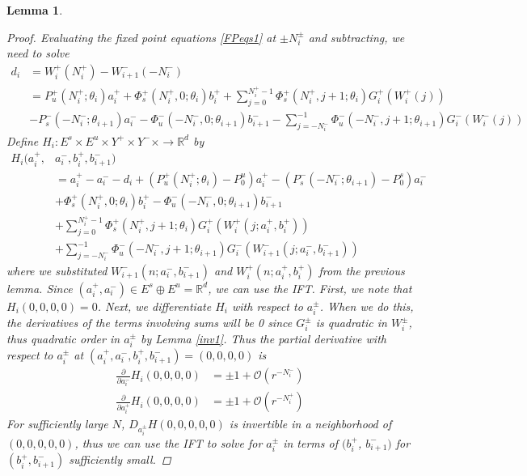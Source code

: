 \documentclass[12pt]{article}
\def\R{{\mathbb R}}
\newtheorem{lemma}{Lemma}
\begin{document}
\begin{lemma}
\begin{proof}
Evaluating the fixed point equations \eqref{FPeqs1} at $\pm N_i^\pm$ and subtracting, we need to solve
\begin{align*}
d_i &= W_i^+(N_i^+) - W_{i+1}^-(-N_i^-) \\
&= P_u^+(N_i^+; \theta_i) a_i^+ + \Phi_s^+(N_i^+, 0; \theta_i) b_i^+ + \sum_{j = 0}^{N_i^+-1} \Phi_s^+(N_i^+, j+1; \theta_i) G_i^+(W_i^+(j)) \\
&-P_s^-(-N_i^-; \theta_{i+1}) a_i^- - \Phi_u^-(-N_i^-, 0; \theta_{i+1}) b_{i+1}^-
- \sum_{j = -N_i^-}^{-1} \Phi_u^-(-N_i^-, j+1; \theta_{i+1}) G_i^-(W_i^-(j))
\end{align*}
Define $H_i: E^s \times E^u \times Y^+ \times Y^- \times \rightarrow \R^d$ by
\begin{align*}
H_i(a_i^+, &a_i^-, b_i^+, b_{i+1}^-) \\
&= a_i^+ - a_i^- - d_i + (P_u^+(N_i^+; \theta_i) - P_0^u) a_i^+ - (P_s^-(-N_i^-; \theta_{i+1}) - P_0^s) a_i^- \\
&+ \Phi_s^+(N_i^+, 0; \theta_i) b_i^+ - \Phi_u^-(-N_i^-, 0; \theta_{i+1}) b_{i+1}^- \\
&+ \sum_{j = 0}^{N_i^+-1} \Phi_s^+(N_i^+, j+1; \theta_i) G_i^+(W_i^+(j; a_i^+, b_i^+)) \\
&+ \sum_{j = -N_i^-}^{-1} \Phi_u^-(-N_i^-, j+1; \theta_{i+1}) G_i^-(W_{i+1}^-(j; a_i^-, b_{i+1}^-))
\end{align*}
where we substituted $W_{i+1}^-(n; a_i^-, b_{i+1}^-)$ and $W_i^+(n; a_i^+, b_i^+)$ from the previous lemma. Since $(a_i^+, a_i^-) \in E^s \oplus E^u = \R^d$, we can use the IFT. First, we note that $H_i(0,0,0,0) = 0$. Next, we differentiate $H_i$ with respect to $a_i^\pm$. When we do this, the derivatives of the terms involving sums will be 0 since $G_i^\pm$ is quadratic in $W_i^\pm$, thus quadratic order in $a_i^\pm$ by Lemma \ref{inv1}. Thus the partial derivative with respect to $a_i^\pm$ at $(a_i^+, a_i^-, b_i^+, b_{i+1}^-) = (0, 0, 0, 0)$ is 
\begin{align*}
\frac{\partial}{\partial a_i^-} H_i(0, 0, 0, 0) &= \pm 1 + \mathcal{O}(r^{-N_i^-}) \\
\frac{\partial}{\partial a_i^+} H_i(0, 0, 0, 0) &= \pm 1 + \mathcal{O}(r^{-N_i^+})
\end{align*}
For sufficiently large $N$, $D_{a_i^\pm} H(0, 0, 0, 0, 0)$ is invertible in a neighborhood of $(0, 0, 0, 0, 0)$, thus we can use the IFT to solve for $a_i^\pm$ in terms of $(b_i^+$, $b_{i+1}^-)$ for $(b_i^+, b_{i+1}^-)$ sufficiently small.


\end{proof}
\end{lemma}
\end{document}
